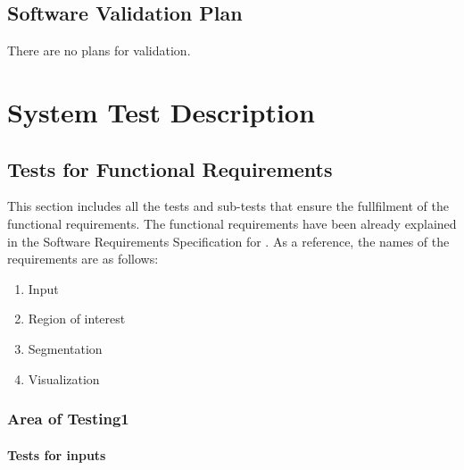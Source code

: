 \documentclass[12pt, titlepage]{article}
\begin{document}
\subsection{Software Validation Plan}


There are no plans for validation.

\section{System Test Description}
	
\subsection{Tests for Functional Requirements}
%
%

This section includes all the tests and sub-tests that ensure the fullfilment of the functional requirements. 
The functional requirements have been already explained in the Software Requirements Specification for \progname{}. As a reference, the names of the requirements are as follows:
\begin{enumerate}
\item{Input}
\item{Region of interest}
\item{Segmentation}
\item{Visualization}
\end{enumerate}

\subsubsection{Area of Testing1}
		
\paragraph{Tests for inputs}
\end{document}
